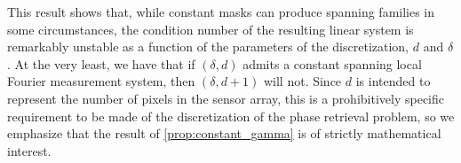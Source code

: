 This result shows that, while constant masks can produce spanning families in some circumstances, the condition number of the resulting linear system is remarkably unstable as a function of the parameters of the discretization, $d$ and $\delta$.  At the very least, we have that if $(\delta, d)$ admits a constant spanning local Fourier measurement system, then $(\delta, d + 1)$ will not.  Since $d$ is intended to represent the number of pixels in the sensor array, this is a prohibitively specific requirement to be made of the discretization of the phase retrieval problem, so we emphasize that the result of \cref{prop:constant_gamma} is of strictly mathematical interest.
